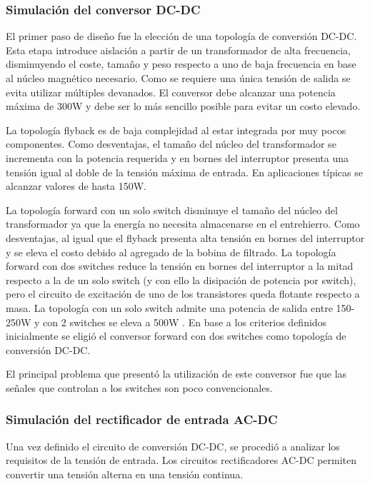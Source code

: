 \subsubsection{Simulación del conversor DC-DC}
El primer paso de diseño fue la elección de una topología de conversión DC-DC.
Esta etapa introduce aislación a partir de un transformador de alta frecuencia,
disminuyendo el coste, tamaño y peso respecto a uno de baja frecuencia en base
al núcleo magnético necesario. Como se requiere una única tensión de salida se
evita utilizar múltiples devanados. El conversor debe alcanzar una potencia
máxima de 300W y debe ser lo más sencillo posible para evitar un costo elevado. 

La topología flyback es de baja complejidad al estar integrada por muy pocos componentes. 
Como desventajas, el tamaño del núcleo del transformador se incrementa con la potencia requerida y en bornes del
interruptor presenta una tensión igual al doble de la tensión máxima de entrada.
En aplicaciones típicas se alcanzar valores de hasta 150W.

La topología forward con un solo switch disminuye el tamaño del núcleo del
transformador ya que la energía no necesita almacenarse en el entrehierro. Como
desventajas, al igual que el flyback presenta alta tensión en bornes del
interruptor y se eleva el costo debido al agregado de la bobina de filtrado. La
topología forward con dos switches reduce la tensión en bornes del interruptor a
la mitad respecto a la de un solo switch (y con ello la disipación de potencia
por switch), pero el circuito de excitación de uno de los transistores queda
flotante respecto a masa. La topología con un solo switch admite una potencia de
salida entre 150-250W y con 2 switches se eleva a 500W \cite{mohan}\cite{hart}.
En base a los criterios definidos inicialmente se eligió el conversor forward
con dos switches como topología de conversión DC-DC. 

El principal problema que presentó la utilización de este conversor fue que las señales que controlan a los switches son poco convencionales.

\subsubsection{Simulación del rectificador de entrada AC-DC}
Una vez definido el circuito de conversión DC-DC, se procedió a analizar los requisitos de la tensión de entrada. 
Los circuitos rectificadores AC-DC permiten convertir una tensión alterna en una tensión continua.

